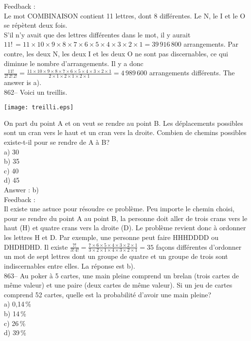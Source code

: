 \documentclass[letterpaper, 12pt]{article}
\begin{document}
Feedback : \\
Le mot COMBINAISON contient 11 lettres, dont 8 diff\'erentes.  Le N, le I et
le O se r\'ep\`etent deux fois.\\
S'il n'y avait que des lettres diff\'erentes dans le mot, il y aurait
$11!\,=11\times10\times9\times8\times7\times6\times5\times4\times3\times2\times1=39\,916\,800$
arrangements.  Par contre, les deux N, les deux I et les deux O ne sont pas
discernables, ce qui diminue le nombre d'arrangements.  Il y a donc
$\frac{11!}{2!\,2!\,2!}=\frac{11\times10\times9\times8\times7\times6\times5\times4\times3\times2\times1}{2\times1\times2\times1\times2\times1}=4\,989\,600$
arrangements diff\'erents.  The answer is a).\\

862-- Voici un treillis.    \begin{center}
    \texttt{[image: treilli.eps]}
    \end{center}
On part du point A et on veut se rendre au point B.  Les d\'eplacements
possibles sont un cran vers le haut et un cran vers la droite.  Combien de
chemins possibles existe-t-il pour se rendre de A \`a B?\\
a) 30\\
b) 35\\
c) 40\\
d) 45\\

Answer : b)\\

Feedback : \\
Il existe une astuce pour r\'esoudre ce probl\`eme. Peu importe le chemin
choisi, pour se rendre du point A au point B, la personne doit aller de
trois crans vers le haut (H) et quatre crans vers la droite (D).  Le
probl\`eme revient donc \`a ordonner les lettres H et D.  Par exemple, une
personne peut faire HHHDDDD ou DHDHDHD.  Il existe
$\frac{7!}{3!\,4!}=\frac{7\times6\times5\times4\times3\times2\times1}{3\times2\times1\times4\times3\times2\times1}=35$
fa\c cons diff\'erentes d'ordonner un mot de sept lettres dont un groupe de
quatre et un groupe de trois sont indiscernables entre elles. La r\'eponse
est b).\\

863-- Au poker \`a 5 cartes, une main pleine comprend un brelan (trois
cartes de m\^eme valeur) et une paire (deux cartes de m\^eme valeur).  Si un
jeu de cartes comprend 52 cartes, quelle est la probabilit\'e d'avoir une
main pleine?\\
a) 0,14\,\%\\
b) 14\,\%\\
c) 26\,\%\\
d) 39\,\%\\
\end{document}
